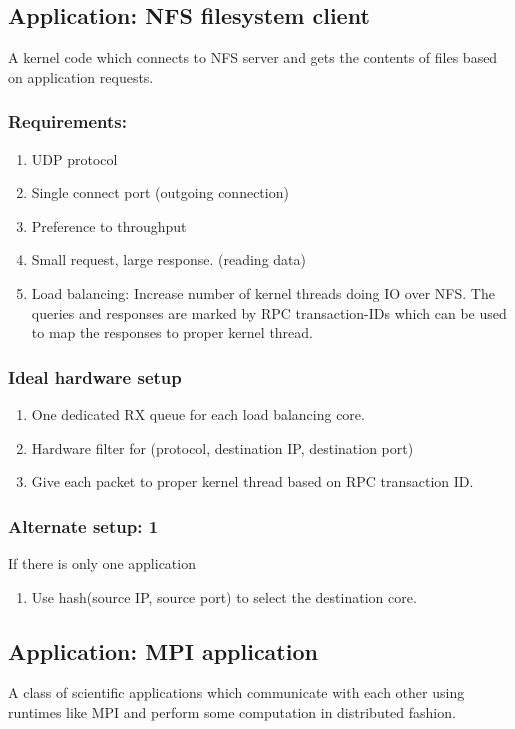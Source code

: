 \subsection{Application: NFS filesystem client}
A kernel code which connects to NFS server and gets the contents of files
based on application requests.
\subsubsection{Requirements:}
\begin{enumerate}
    \item UDP protocol
    \item Single connect port (outgoing connection)
    \item Preference to throughput
    \item Small request, large response. (reading data)
    \item Load balancing: Increase number of kernel threads doing IO over NFS.
        The queries and responses are marked by RPC transaction-IDs which
        can be used to map the responses to proper kernel thread.
\end{enumerate}



\subsubsection{Ideal hardware setup}
\begin{enumerate}
    \item One dedicated RX queue for each load balancing core.
    \item Hardware filter for (protocol, destination IP, destination port)
    \item Give each packet to proper kernel thread based on RPC
        transaction ID.
\end{enumerate}

\subsubsection{Alternate setup: 1}
If there is only one application
\begin{enumerate}
    \item Use hash(source IP, source port) to select the destination core.
\end{enumerate}





\subsection{Application: MPI application}
A class of scientific applications which communicate with each other using
runtimes like MPI and perform some computation in distributed fashion.


